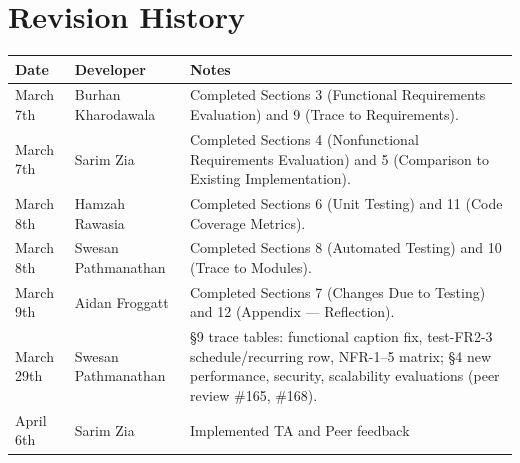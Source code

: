 \section{Revision History}

\begin{tabularx}{\textwidth}{llX}
\toprule {\bf Date} & {\bf Developer} & {\bf Notes}\\
\midrule
March 7th & Burhan Kharodawala & Completed Sections 3 (Functional Requirements Evaluation) and 9 (Trace to Requirements).\\
March 7th & Sarim Zia & Completed Sections 4 (Nonfunctional Requirements Evaluation) and 5 (Comparison to Existing Implementation).\\
March 8th & Hamzah Rawasia & Completed Sections 6 (Unit Testing) and 11 (Code Coverage Metrics).\\
March 8th & Swesan Pathmanathan & Completed Sections 8 (Automated Testing) and 10 (Trace to Modules).\\
March 9th & Aidan Froggatt & Completed Sections 7 (Changes Due to Testing) and 12 (Appendix --- Reflection).\\
March 29th & Swesan Pathmanathan & \S9 trace tables: functional caption fix, test-FR2-3 schedule/recurring row, NFR-1--5 matrix; \S4 new performance, security, scalability evaluations (peer review \#165, \#168).\\
April 6th & Sarim Zia & Implemented TA and Peer feedback \\
\bottomrule
\end{tabularx}

~\newpage
